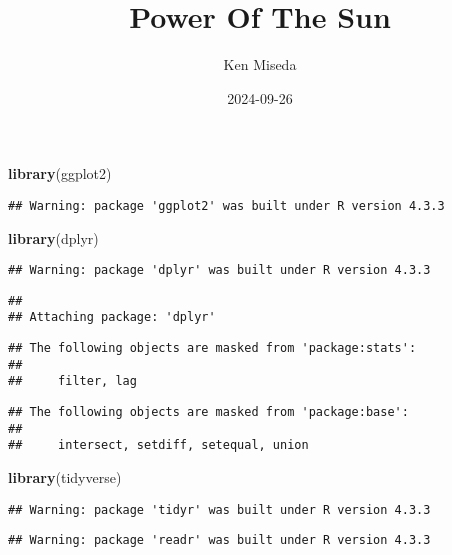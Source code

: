 \documentclass[
]{article}
\title{Power Of The Sun}
\author{Ken Miseda}
\date{2024-09-26}
\newenvironment{Shaded}{\begin{snugshade}}{\end{snugshade}}
\newcommand{\FunctionTok}[1]{\textcolor[rgb]{0.13,0.29,0.53}{\textbf{#1}}}
\newcommand{\NormalTok}[1]{#1}
\begin{document}
\maketitle

\begin{Shaded}
\begin{Highlighting}[]
\FunctionTok{library}\NormalTok{(ggplot2)}
\end{Highlighting}
\end{Shaded}

\begin{verbatim}
## Warning: package 'ggplot2' was built under R version 4.3.3
\end{verbatim}

\begin{Shaded}
\begin{Highlighting}[]
\FunctionTok{library}\NormalTok{(dplyr)}
\end{Highlighting}
\end{Shaded}

\begin{verbatim}
## Warning: package 'dplyr' was built under R version 4.3.3
\end{verbatim}

\begin{verbatim}
## 
## Attaching package: 'dplyr'
\end{verbatim}

\begin{verbatim}
## The following objects are masked from 'package:stats':
## 
##     filter, lag
\end{verbatim}

\begin{verbatim}
## The following objects are masked from 'package:base':
## 
##     intersect, setdiff, setequal, union
\end{verbatim}

\begin{Shaded}
\begin{Highlighting}[]
\FunctionTok{library}\NormalTok{(tidyverse)}
\end{Highlighting}
\end{Shaded}

\begin{verbatim}
## Warning: package 'tidyr' was built under R version 4.3.3
\end{verbatim}

\begin{verbatim}
## Warning: package 'readr' was built under R version 4.3.3
\end{verbatim}
\end{document}
